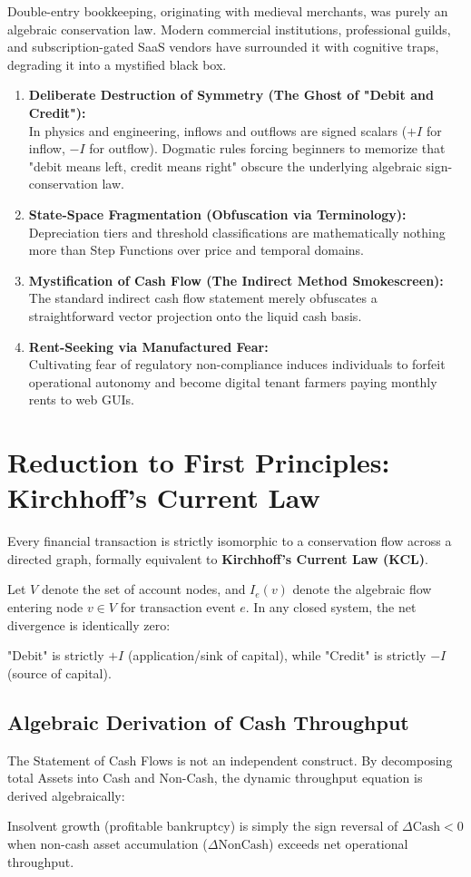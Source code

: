 Double-entry bookkeeping, originating with medieval merchants, was purely an algebraic conservation law. Modern commercial institutions, professional guilds, and subscription-gated SaaS vendors have surrounded it with cognitive traps, degrading it into a mystified black box.

\begin{enumerate}
    \item \textbf{Deliberate Destruction of Symmetry (The Ghost of "Debit and Credit"):}\\
    In physics and engineering, inflows and outflows are signed scalars ($+I$ for inflow, $-I$ for outflow). Dogmatic rules forcing beginners to memorize that "debit means left, credit means right" obscure the underlying algebraic sign-conservation law.
    \item \textbf{State-Space Fragmentation (Obfuscation via Terminology):}\\
    Depreciation tiers and threshold classifications are mathematically nothing more than Step Functions over price and temporal domains.
    \item \textbf{Mystification of Cash Flow (The Indirect Method Smokescreen):}\\
    The standard indirect cash flow statement merely obfuscates a straightforward vector projection onto the liquid cash basis.
    \item \textbf{Rent-Seeking via Manufactured Fear:}\\
    Cultivating fear of regulatory non-compliance induces individuals to forfeit operational autonomy and become digital tenant farmers paying monthly rents to web GUIs.
\end{enumerate}

\section{Reduction to First Principles: Kirchhoff's Current Law}
Every financial transaction is strictly isomorphic to a conservation flow across a directed graph, formally equivalent to \textbf{Kirchhoff's Current Law (KCL)}.

Let $V$ denote the set of account nodes, and $I_e(v)$ denote the algebraic flow entering node $v \in V$ for transaction event $e$. In any closed system, the net divergence is identically zero:


"Debit" is strictly $+I$ (application/sink of capital), while "Credit" is strictly $-I$ (source of capital).

\subsection{Algebraic Derivation of Cash Throughput}
The Statement of Cash Flows is not an independent construct. By decomposing total Assets into Cash and Non-Cash, the dynamic throughput equation is derived algebraically:


Insolvent growth (profitable bankruptcy) is simply the sign reversal of $\Delta \text{Cash} < 0$ when non-cash asset accumulation ($\Delta \text{NonCash}$) exceeds net operational throughput.
\fi
